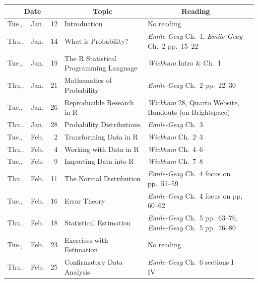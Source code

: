 \documentclass[11pt,twoside]{jgsyllabus}\usepackage[]{graphicx}\usepackage[]{xcolor}
\begin{document}
\setlength{\aboverulesep}{0.2ex}
\setlength{\belowrulesep}{0.2ex}
\setlength{\extrarowheight}{0.1ex}
\setlength{\heavyrulewidth}{0.5pt}
\setlength{\lightrulewidth}{0.05pt}
\begin{center}
\begin{tabular}{l@{~}c@{~}r>{\raggedright}m{2.6in}>{\centering}m{2in}c}
  \toprule
  \multicolumn{3}{c}{\bfseries Date} & \multicolumn{1}{c}{\bfseries Topic} &\multicolumn{1}{c}{\bfseries Reading} &\\
 \midrule
Tue., & Jan. &  12 & Introduction & No reading &  \\ 
   \midrule
Thu., & Jan. &  14 & What is Probability? & \emph{Emile-Geay\/} Ch.~1, \emph{Emile-Geay\/} Ch.~2 pp.~15--22 &  \\ 
   \midrule
Tue., & Jan. &  19 & The R Statistical Programming Language & \emph{Wickham\/} Intro \& Ch.~1 &  \\ 
   \midrule
Thu., & Jan. &  21 & Mathematics of Probability & \emph{Emile-Geay\/} Ch.~2 pp.~22--30 &  \\ 
   \midrule
Tue., & Jan. &  26 & Reproducible Research in R & \emph{Wickham\/} 28, Quarto Website, Handouts (on Brightspace) &  \\ 
   \midrule
Thu., & Jan. &  28 & Probability Distributions & \emph{Emile-Geay\/} Ch.~3 &  \\ 
   \midrule
Tue., & Feb. &   2 & Transforming Data in R & \emph{Wickham\/} Ch.~2--3 &  \\ 
   \midrule
Thu., & Feb. &   4 & Working with Data in R & \emph{Wickham\/} Ch.~4--6 &  \\ 
   \midrule
Tue., & Feb. &   9 & Importing Data into R & \emph{Wickham\/} Ch.~7--8 &  \\ 
   \midrule
Thu., & Feb. &  11 & The Normal Distribution & \emph{Emile-Geay\/} Ch.~4 focus on pp.~51--59 &  \\ 
   \midrule
Tue., & Feb. &  16 & Error Theory & \emph{Emile-Geay\/} Ch.~4 focus on pp, 60--62 &  \\ 
   \midrule
Thu., & Feb. &  18 & Statistical Estimation & \emph{Emile-Geay\/} Ch.~5 pp.~63--76, \emph{Emile-Geay\/} Ch.~5 pp.~76--80 &  \\ 
   \midrule
Tue., & Feb. &  23 & Exercises with Estimation & No reading &  \\ 
   \midrule
Thu., & Feb. &  25 & Confirmatory Data Analysis & \emph{Emile-Geay\/} Ch.~6 sections I--IV &  \\ 

\end{tabular}
\end{center}
\end{document}
